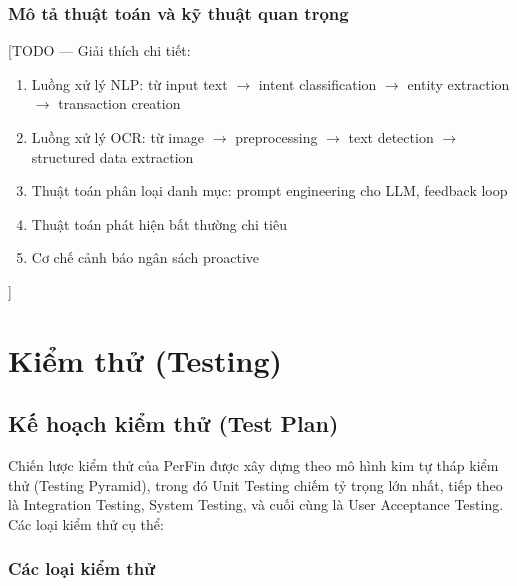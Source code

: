 \subsubsection{Mô tả thuật toán và kỹ thuật quan trọng}
[TODO --- Giải thích chi tiết:
\begin{enumerate}
    \item Luồng xử lý NLP: từ input text $\rightarrow$ intent classification $\rightarrow$ entity extraction $\rightarrow$ transaction creation
    \item Luồng xử lý OCR: từ image $\rightarrow$ preprocessing $\rightarrow$ text detection $\rightarrow$ structured data extraction
    \item Thuật toán phân loại danh mục: prompt engineering cho LLM, feedback loop
    \item Thuật toán phát hiện bất thường chi tiêu
    \item Cơ chế cảnh báo ngân sách proactive
\end{enumerate}
]

\section{Kiểm thử (Testing)}
\label{sec:testing}

\subsection{Kế hoạch kiểm thử (Test Plan)}
\label{subsec:test_plan}

Chiến lược kiểm thử của PerFin được xây dựng theo mô hình kim tự tháp kiểm thử (Testing Pyramid), trong đó Unit Testing chiếm tỷ trọng lớn nhất, tiếp theo là Integration Testing, System Testing, và cuối cùng là User Acceptance Testing. Các loại kiểm thử cụ thể:

\subsubsection{Các loại kiểm thử}

